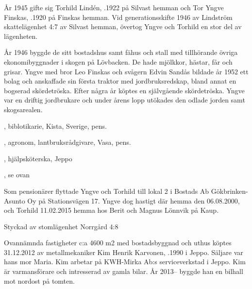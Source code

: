 År 1945 gifte sig Torhild Lindén, .1922 på Silvast hemman och Tor Yngve Finskas, .1920 på Finskas hemman. Vid generationsskifte 1946 av Lindström skattelägenhet 4:7 av Silvast hemman, övertog Yngve och Torhild en stor del av lägenheten.

År 1946 byggde de sitt bostadshus samt fähus och stall med tillhörande övriga ekonomibyggnader i skogen på Lövbacken. De hade mjölkkor, hästar, får och grisar. Yngve med bror Leo Finskas och svågern Edvin Sandås bildade år 1952 ett bolag och anskaffade sin första traktor med jordbruksredskap, bland annat en bogserad skördetröska. Efter några år köptes en självgående skördetröska. Yngve var en driftig jordbrukare och under årens lopp utökades den odlade jorden samt skogsarealen.
\begin{jhchildren}
  \item {}, biblotikarie, Kista, Sverige, pens.
  \item {}, agronom, lantbruksrådgivare, Vasa, pens.
  \item {}, hjälpsköterska, Jeppo
  \item {}, se ovan
\end{jhchildren}
Som pensionärer flyttade Yngve och Torhild till lokal 2 i Bostads Ab Gökbrinken-Asunto Oy på Stationsvägen 17. Yngve dog hastigt där hemma den 06.08.2000, och Torhild 11.02.2015 hemma hos Berit och Magnus Lönnvik på Kaup.



Styckad av stomlägenhet Norrgård 4:8


Ovannämnda fastigheter c:a 4600 m2 med bostadsbyggnad och uthus köptes 31.12.2012 av metallmekaniker Kim Henrik Karvonen, .1990 i Jeppo. Säljare var hans mor Maria. Kim arbetar på KWH-Mirka Ab:s serviceverkstad i Jeppo. Kim är varmansförare och intresserad av gamla bilar. År 2013-- byggde han en bilhall mot nordost på tomten.


